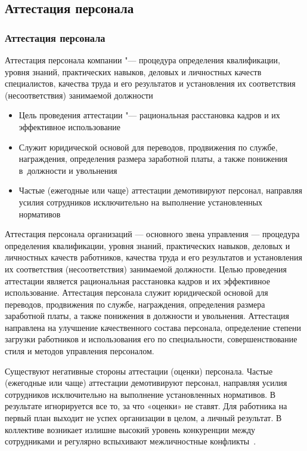 \documentclass{../industrial-development}
\begin{document}
\subsection{Аттестация персонала}

\begin{frame} \frametitle{Аттестация персонала}
	
 \alert{Аттестация персонала компании} "--- процедура определения квалификации, уровня знаний, практических навыков, деловых и личностных качеств специалистов, качества труда и его результатов и установления их соответствия (несоответствия) занимаемой должности 
	
  \begin{itemize}
	\item Цель проведения аттестации "--- рациональная расстановка кадров и их эффективное использование
	\item Служит юридической основой для переводов, продвижения по службе, награждения, определения размера заработной платы, а также понижения в~должности и увольнения
	\item Частые (ежегодные или чаще) аттестации демотивируют персонал, направляя усилия сотрудников исключительно на выполнение установленных нормативов
	  \end{itemize}
		
	\end{frame}

\lecturenotes

Аттестация персонала организаций — основного звена управления — процедура определения квалификации, уровня знаний, практических навыков, деловых и личностных качеств работников, качества труда и его результатов и установления их соответствия (несоответствия) занимаемой должности. Целью проведения аттестации является рациональная расстановка кадров и их эффективное использование. Аттестация персонала служит юридической основой для переводов, продвижения по службе, награждения, определения размера заработной платы, а также понижения в должности и увольнения. Аттестация направлена на улучшение качественного состава персонала, определение степени загрузки работников и использования его по специальности, совершенствование стиля и методов управления персоналом.


Существуют негативные стороны аттестации (оценки) персонала. Частые (ежегодные или чаще) аттестации демотивируют персонал, направляя усилия сотрудников исключительно на выполнение установленных нормативов. В результате игнорируется все то, за что «оценки» не ставят. Для работника на первый план выходит не успех организации в целом, а личный результат. В коллективе возникает излишне высокий уровень конкуренции между сотрудниками и регулярно вспыхивают межличностные конфликты~\cite[с.~418]{Kibanov}.
\end{document}
